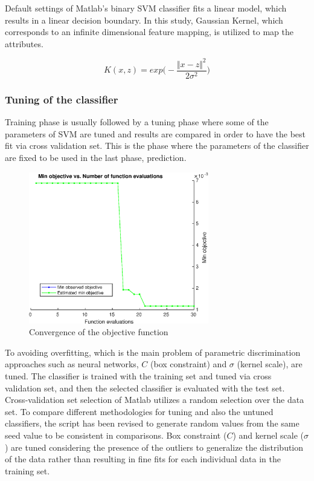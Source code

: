 Default settings of Matlab's binary SVM classifier fits a linear model, which results in a linear decision boundary.  
In this study, Gaussian Kernel, which corresponds to an infinite dimensional feature mapping, is utilized to map the attributes.

\begin{equation}
K (x,z) = exp \bigg(-\frac{\Vert x - z \Vert ^ 2}{2 \sigma^2} \bigg)
\end{equation}


\subsubsection{Tuning of the classifier}

Training phase is usually followed by a tuning phase where some of the parameters of SVM are tuned and results are compared in order to have the best fit via cross validation set. This is the phase where the parameters of the classifier are fixed to be used in the last phase, prediction.

\begin{figure}
\begin{center}
\includegraphics[width=0.7\textwidth]{figures/objectiveFuncEval}    %
\caption{Convergence of the objective function} 
\label{fig:objectiveFuncEval}
\end{center}
\end{figure}

To avoiding overfitting, which is the main problem of parametric discrimination approaches such as neural networks, $C$ (box constraint) and $\sigma$ (kernel scale), are tuned.
The classifier is trained with the training set and tuned via cross validation set, and then the selected classifier is evaluated with the test set. Cross-validation set selection of Matlab utilizes a random selection over the data set. 
To compare different methodologies for tuning and also the untuned classifiers, the script has been revised to generate random values from the same seed value to be consistent in comparisons.
Box constraint ($C$) and kernel scale ($\sigma$) are tuned considering the presence of the outliers to generalize the distribution of the data rather than resulting in fine fits for each individual data in the training set. 

